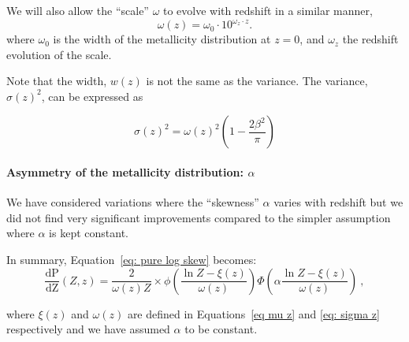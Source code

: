 \documentclass[twocolumn]{aastex631}
\newcommand{\dPdZ}{\ensuremath{\mathrm{\frac{dP}{dZ}}(Z,z)}\xspace}
\newcommand{\dpdZ}{\ensuremath{\mathrm{dP/dZ}(Z,z)}\xspace}
\begin{document}
We will also allow the ``scale'' $\omega$ to evolve with redshift in a similar manner, 
\begin{equation}
\label{eq: sigma z}
    \omega(z) = \omega_0 \cdot 10^{\omega_z \cdot z}.
\end{equation}
where $\omega_0$ is
the width of the metallicity distribution at $z=0$, and $\omega_z$
the redshift evolution of the scale.

Note that the width, $w(z)$ is not the same as the variance. The variance, $\sigma(z)^2$, can be expressed as

\begin{equation}
    \sigma(z)^2 = \omega(z)^2 \left( 1 - \frac{2\beta^2}{\pi} \right)
\end{equation}

\paragraph{Asymmetry of the metallicity distribution: $\alpha$}
We have considered variations where the ``skewness'' $\alpha$ varies with redshift but we did not find very significant improvements compared to the simpler assumption where $\alpha$ is kept constant. 



In summary, Equation~\ref{eq: pure log skew} becomes:
\begin{equation}
\label{eq: z log skew}
\boxed{
    \dPdZ = \frac{2}{\omega(z) Z} \times \phi \left(\frac{\ln Z - \xi(z)}{\omega(z)}\right) \Phi\left(\alpha \frac{\ln Z - \xi(z)}{\omega(z)} \right)
    } \ , 
\end{equation}

\noindent where $\xi(z)$ and $\omega(z)$ are defined in Equations~\ref{eq mu z} and \ref{eq: sigma z} respectively and we have assumed $\alpha$ to be constant.

\end{document}
